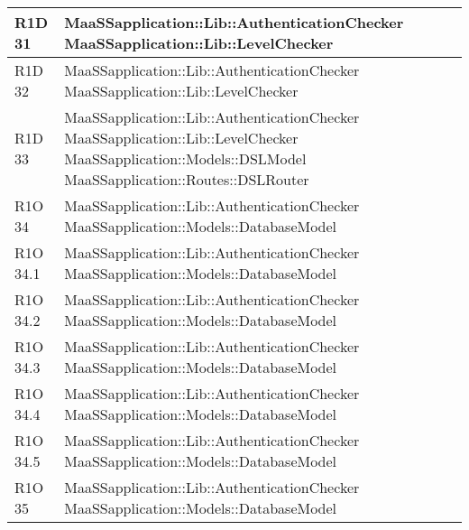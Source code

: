 \begin{center}
\begin{longtable}{ | l | p{8cm} |}
    R1D 31 & MaaSSapplication::Lib::AuthenticationChecker \newline MaaSSapplication::Lib::LevelChecker \\ \hline
    
    R1D 32 & MaaSSapplication::Lib::AuthenticationChecker \newline MaaSSapplication::Lib::LevelChecker \\ \hline
        
    R1D 33 & MaaSSapplication::Lib::AuthenticationChecker \newline MaaSSapplication::Lib::LevelChecker \newline  MaaSSapplication::Models::DSLModel \newline MaaSSapplication::Routes::DSLRouter \\ \hline
    
    R1O 34 & MaaSSapplication::Lib::AuthenticationChecker \newline  MaaSSapplication::Models::DatabaseModel \\ \hline
      	
   	R1O 34.1 & MaaSSapplication::Lib::AuthenticationChecker \newline  MaaSSapplication::Models::DatabaseModel \\ \hline
   	
   	R1O 34.2 & MaaSSapplication::Lib::AuthenticationChecker \newline  MaaSSapplication::Models::DatabaseModel \\ \hline
   	
   	R1O 34.3 & MaaSSapplication::Lib::AuthenticationChecker \newline  MaaSSapplication::Models::DatabaseModel \\ \hline
     	
    R1O 34.4 & MaaSSapplication::Lib::AuthenticationChecker \newline  MaaSSapplication::Models::DatabaseModel \\ \hline
    
    R1O 34.5 & MaaSSapplication::Lib::AuthenticationChecker \newline  MaaSSapplication::Models::DatabaseModel \\ \hline
    
    R1O 35 & MaaSSapplication::Lib::AuthenticationChecker \newline  MaaSSapplication::Models::DatabaseModel \\ \hline
    

\end{longtable}
\end{center}
